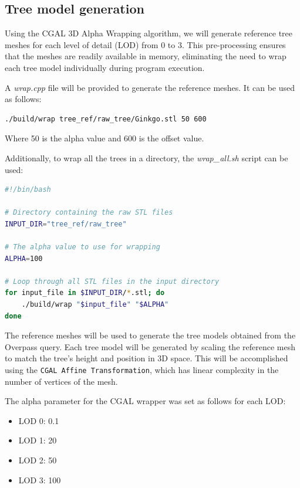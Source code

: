\documentclass[12pt]{article}
\begin{document}
\subsection{Tree model generation}
Using the CGAL 3D Alpha Wrapping algorithm, we will generate reference tree
meshes for each level of detail (LOD) from 0 to 3. This pre-processing ensures
that the meshes are readily available in memory, eliminating the need to wrap
each tree model individually during program execution.

A \textit{wrap.cpp} file will be provided to generate the reference meshes.
It can be used as follows:

\begin{lstlisting}[language=bash]
./build/wrap tree_ref/raw_tree/Ginkgo.stl 50 600
\end{lstlisting}

Where 50 is the alpha value and 600 is the offset value.

Additionally, to wrap all the trees in a directory, the \textit{wrap\_all.sh}
script can be used:

\begin{lstlisting}[language=bash]
#!/bin/bash

# Directory containing the raw STL files
INPUT_DIR="tree_ref/raw_tree"

# The alpha value to use for wrapping
ALPHA=100

# Loop through all STL files in the input directory
for input_file in $INPUT_DIR/*.stl; do
	./build/wrap "$input_file" "$ALPHA"
done
\end{lstlisting}

The reference meshes will be used to generate the tree models obtained from
the Overpass query. Each tree model will be generated by scaling the reference
mesh to match the tree's height and position in 3D space. This will be
accomplished using the
\texttt{CGAL Affine Transformation}\cite{cgal_affine_transformation},
which has linear complexity in the number of vertices of the mesh.

\newpage

The alpha parameter for the CGAL wrapper was set as follows for each LOD:

\begin{itemize}
    \item LOD 0: 0.1
    \item LOD 1: 20
    \item LOD 2: 50
    \item LOD 3: 100
\end{itemize}
\end{document}
